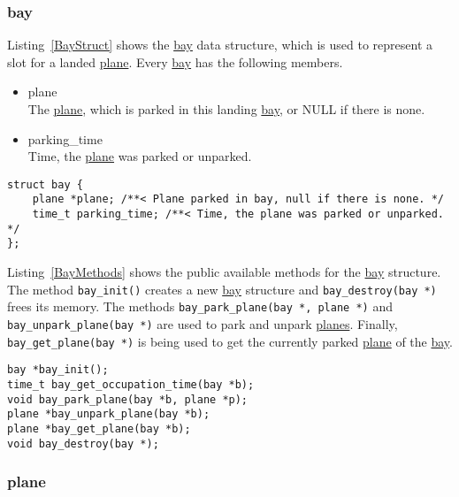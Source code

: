 \documentclass[a4paper, 12pt]{scrartcl} %
\begin{document}
\subsubsection{bay}

\label{sec:bay}
Listing~\ref{BayStruct} shows the \hyperref[sec:bay]{bay} data structure, which
is used to represent a slot for a landed \hyperref[sec:plane]{plane}. Every
\hyperref[sec:bay]{bay} has the following members.
\begin{itemize}
  \item {plane} \\
    The \hyperref[sec:plane]{plane}, which is parked in this landing
    \hyperref[sec:bay]{bay}, or NULL if there is none.
  \item{parking\_time} \\
    Time, the \hyperref[sec:plane]{plane} was parked or unparked.
\end{itemize}
\begin{lstlisting}
struct bay {
    plane *plane; /**< Plane parked in bay, null if there is none. */
    time_t parking_time; /**< Time, the plane was parked or unparked. */
};
\end{lstlisting}
Listing~\ref{BayMethods} shows the public available methods for the
\hyperref[sec:bay]{bay} structure. The method \texttt{bay\_init()} creates a
new \hyperref[sec:bay]{bay} structure and \texttt{bay\_destroy(bay *)} frees
its memory. The methods \texttt{bay\_park\_plane(bay *, plane *)} and
\texttt{bay\_unpark\_plane(bay *)} are used to park and unpark
\hyperref[sec:plane]{planes}. Finally, \texttt{bay\_get\_plane(bay *)} is being
used to get the currently parked \hyperref[sec:plane]{plane} of the
\hyperref[sec:bay]{bay}.
\begin{lstlisting}
bay *bay_init();
time_t bay_get_occupation_time(bay *b);
void bay_park_plane(bay *b, plane *p);
plane *bay_unpark_plane(bay *b);
plane *bay_get_plane(bay *b);
void bay_destroy(bay *);
\end{lstlisting}

\subsubsection{plane}
\end{document}
